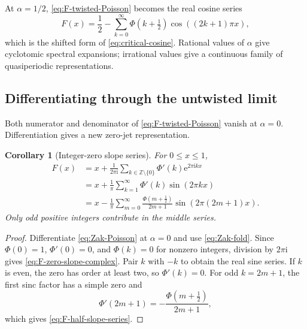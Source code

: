 \documentclass[11pt,oneside]{article}
\numberwithin{equation}{section}
\newtheorem{corollary}[theorem]{Corollary}
\theoremstyle{definition}
\theoremstyle{remark}
\newcommand{\Z}{\mathbb Z}
\newcommand{\e}{\mathrm e}
\newcommand{\ii}{\mathrm i}
\begin{document}
At $\alpha=1/2$, \eqref{eq:F-twisted-Poisson} becomes the real cosine series
\begin{equation}
 F(x)=\frac12-
 \sum_{k=0}^{\infty}\Phi(k+\tfrac12)
   \cos((2k+1)\pi x),                                     \label{eq:F-half-integer-cosine}
\end{equation}
which is the shifted form of \eqref{eq:critical-cosine}.  Rational values of
$\alpha$ give cyclotomic spectral expansions; irrational values give a
continuous family of quasiperiodic representations.

\subsection{Differentiating through the untwisted limit}

Both numerator and denominator of \eqref{eq:F-twisted-Poisson} vanish at
$\alpha=0$.  Differentiation gives a new zero-jet representation.

\begin{corollary}[Integer-zero slope series]
\label{cor:zero-slope-F}
For $0\le x\le1$,
\begin{align}
 F(x)
 &=x+\frac1{2\pi\ii}
   \sum_{k\in\Z\setminus\{0\}}\Phi'(k)\e^{2\pi\ii kx}    \label{eq:F-zero-slope-complex}\\
 &=x+\frac1\pi\sum_{k=1}^{\infty}\Phi'(k)
   \sin(2\pi kx)                                         \label{eq:F-zero-slope-real}\\
 &=x-\frac1\pi\sum_{m=0}^{\infty}
   \frac{\Phi(m+\tfrac12)}{2m+1}
   \sin(2\pi(2m+1)x).                                    \label{eq:F-half-slope-series}
\end{align}
Only odd positive integers contribute in the middle series.
\end{corollary}

\begin{proof}
Differentiate \eqref{eq:Zak-Poisson} at $\alpha=0$ and use
\eqref{eq:Zak-fold}.  Since $\Phi(0)=1$, $\Phi'(0)=0$, and
$\Phi(k)=0$ for nonzero integers, division by $2\pi\ii$ gives
\eqref{eq:F-zero-slope-complex}.  Pair $k$ with $-k$ to obtain the real sine
series.  If $k$ is even, the zero has order at least two, so $\Phi'(k)=0$.
For odd $k=2m+1$, the first sinc factor has a simple zero and
\begin{equation}
 \Phi'(2m+1)=-\frac{\Phi(m+\tfrac12)}{2m+1},               \label{eq:odd-zero-slope}
\end{equation}
which gives \eqref{eq:F-half-slope-series}.
\end{proof}
\end{document}
